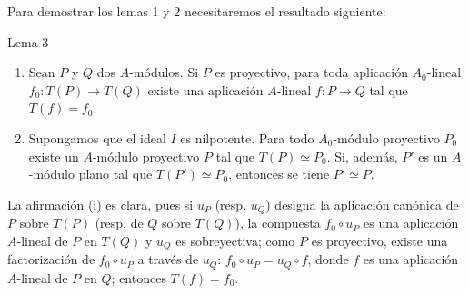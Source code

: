 Para demostrar los lemas 1 y 2 necesitaremos el resultado siguiente:

\begin{statement}{Lema 3}
\begin{enumerate}[label=(\roman*)]
\item Sean $P$ y $Q$ dos $A$-módulos. Si $P$ es proyectivo, para toda aplicación $A_0$-lineal $f_0:T(P)\to T(Q)$ existe una aplicación $A$-lineal $f:P\to Q$ tal que $T(f)=f_0$.
\item Supongamos que el ideal $I$ es nilpotente. Para todo $A_0$-módulo proyectivo $P_0$ existe un $A$-módulo proyectivo $P$ tal que $T(P)\simeq P_0$. Si, además, $P'$ es un $A$-módulo plano tal que $T(P')\simeq P_0$, entonces se tiene $P'\simeq P$.
\end{enumerate}
\end{statement}

La afirmación (i) es clara, pues si $u_P$ (resp. $u_Q$) designa la aplicación canónica de $P$ sobre $T(P)$ (resp. de $Q$ sobre $T(Q)$), la compuesta $f_0\circ u_P$ es una aplicación $A$-lineal de $P$ en $T(Q)$ y $u_Q$ es sobreyectiva; como $P$ es proyectivo, existe una factorización de $f_0\circ u_P$ a través de $u_Q$: $f_0\circ u_P=u_Q\circ f$, donde $f$ es una aplicación $A$-lineal de $P$ en $Q$; entonces $T(f)=f_0$.
